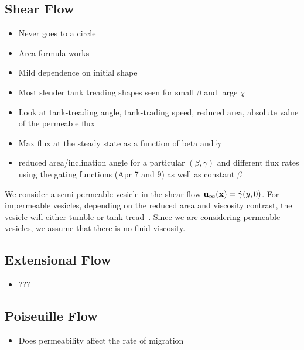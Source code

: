 \documentclass[aps,prl,showpacs]{revtex4}
\newif\ifTikz
\begin{document}
\subsection{Shear Flow}
\begin{itemize}
  \item Never goes to a circle
  \item Area formula works
  \item Mild dependence on initial shape
  \item Most slender tank treading shapes seen for small $\beta$ and
    large $\chi$

  \item Look at tank-treading angle, tank-trading speed, reduced area,
    absolute value of the permeable flux
  \item Max flux at the steady state as a function of beta and
    $\dot{\gamma}$

  \item reduced area/inclination angle for a particular $(\beta,\gamma)$
    and different flux rates using the gating functions (Apr 7 and 9) as
    well as constant $\beta$
\end{itemize}

We consider a semi-permeable vesicle in the shear flow
$\mathbf{u}_{\infty}(\mathbf{x}) = \dot{\gamma} (y,0)$. For impermeable vesicles,
depending on the reduced area and viscosity contrast, the vesicle will
either tumble or tank-tread~\cite{fin-lam-sei-gom2008}. Since we are
considering permeable vesicles, we assume that there is no fluid
viscosity. 


% 

\subsection{Extensional Flow}
\begin{itemize}
  \item ???
\end{itemize}

%

\subsection{Poiseuille Flow}
\begin{itemize}
  \item Does permeability affect the rate of migration
\end{itemize}
\end{document}
